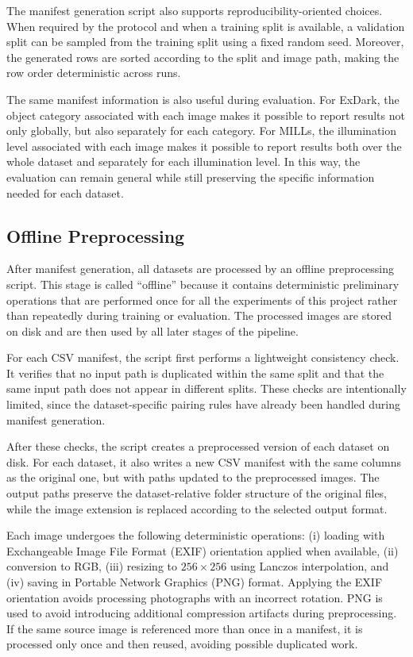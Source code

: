 The manifest generation script also supports reproducibility-oriented choices. When required by the protocol and when a training split is available, a validation split can be sampled from the training split using a fixed random seed. Moreover, the generated rows are sorted according to the split and image path, making the row order deterministic across runs.

The same manifest information is also useful during evaluation. For ExDark, the object category associated with each image makes it possible to report results not only globally, but also separately for each category. For MILLs, the illumination level associated with each image makes it possible to report results both over the whole dataset and separately for each illumination level. In this way, the evaluation can remain general while still preserving the specific information needed for each dataset.

\subsection{Offline Preprocessing}

After manifest generation, all datasets are processed by an offline preprocessing script. This stage is called ``offline'' because it contains deterministic preliminary operations that are performed once for all the experiments of this project rather than repeatedly during training or evaluation. The processed images are stored on disk and are then used by all later stages of the pipeline.

For each CSV manifest, the script first performs a lightweight consistency check. It verifies that no input path is duplicated within the same split and that the same input path does not appear in different splits. These checks are intentionally limited, since the dataset-specific pairing rules have already been handled during manifest generation.

After these checks, the script creates a preprocessed version of each dataset on disk. For each dataset, it also writes a new CSV manifest with the same columns as the original one, but with paths updated to the preprocessed images. The output paths preserve the dataset-relative folder structure of the original files, while the image extension is replaced according to the selected output format.

Each image undergoes the following deterministic operations: (i) loading with Exchangeable Image File Format (EXIF) orientation applied when available, (ii) conversion to RGB, (iii) resizing to $256 \times 256$ using Lanczos interpolation, and (iv) saving in Portable Network Graphics (PNG) format. Applying the EXIF orientation avoids processing photographs with an incorrect rotation. PNG is used to avoid introducing additional compression artifacts during preprocessing. If the same source image is referenced more than once in a manifest, it is processed only once and then reused, avoiding possible duplicated work.

